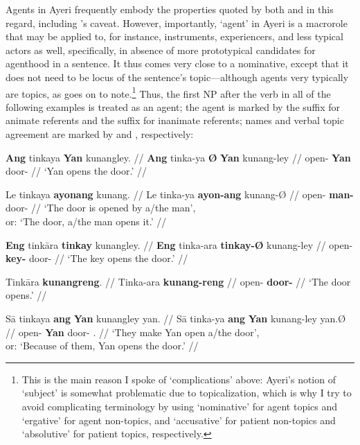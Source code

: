 Agents in Ayeri frequently embody the properties quoted by both 
\citeauthor{fillmore1968} and \citeauthor{payne1997} in this regard, including 
\citeauthor{fillmore1968}'s caveat. However, importantly, `agent' in Ayeri is a 
macrorole that may be applied to, for instance, instruments, experiencers, and 
less typical actors as well, specifically, in absence of more prototypical 
candidates for agenthood in a sentence. It thus comes very close to a 
nominative, except that it does not need to be locus of the sentence's 
topic---although agents very typically are topics, as 
\citet[151]{payne1997} goes on to note.\footnote{This is the main reason I 
spoke of `complications' above: Ayeri's notion of `subject' is somewhat 
problematic due to topicalization, which is why I try to avoid complicating 
terminology by using `nominative' for agent topics and `ergative' for agent 
non-topics, and `accusative' for patient non-topics and `absolutive' for patient 
topics, respectively.} Thus, the first NP after the verb in all of the following 
examples is treated as an agent; the agent is marked by the suffix 
 for animate referents and the suffix  for 
inanimate referents; names and verbal topic agreement are marked by 
 and , respectively:

\pex
\a\begingl
	\gla \textbf{Ang} tinkaya \textbf{{}} \textbf{Yan} kunangley. //
	\glb \textbf{Ang} tinka-ya \textbf{Ø} \textbf{Yan} kunang-ley //
	\glc \textbf{\AgtT{}} open-\TsgM{} \textbf{\Top{}} \textbf{Yan} 
		door-\PargI{} //
	\glft `Yan opens the door.' //
\endgl

\a\begingl
	\gla Le tinkaya \textbf{ayonang} kunang. //
	\glb Le tinka-ya \textbf{ayon-ang} kunang-Ø //
	\glc \PatT{} open-\TsgM{} \textbf{man-\Aarg{}} door-\Top{} //
	\glft `The door is opened by a/the man',\\
		or: `The door, a/the man opens it.' //
\endgl

\a\begingl
	\gla \textbf{Eng} tinkāra \textbf{tinkay} kunangley. //
	\glb \textbf{Eng} tinka-ara \textbf{tinkay-Ø} kunang-ley //
	\glc \textbf{\AgtTI{}} open-\TsgI{} \textbf{key-\Top{}} door-\PargI{} //
	\glft `The key opens the door.' //
\endgl

\a\begingl
	\gla Tinkāra \textbf{kunangreng}. //
	\glb Tinka-ara \textbf{kunang-reng} //
	\glc open-\TsgI{} \textbf{door-\AargI{}} //
	\glft `The door opens.' //
\endgl

\a\begingl
	\gla Sā tinkaya \textbf{ang} \textbf{Yan} kunangley yan. //
	\glb Sā tinka-ya \textbf{ang} \textbf{Yan} kunang-ley yan.Ø //
	\glc \CauT{} open-\TsgM{} \textbf{\Aarg{}} \textbf{Yan} door-\PargI{} 
		\TsgM{}.\Top{} //
	\glft `They make Yan open a/the door',\\
		or: `Because of them, Yan opens the door.' //
\endgl

